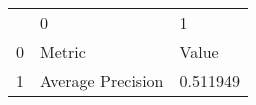 \begin{tabular}{lll}
 & 0 & 1 \\
0 & Metric & Value \\
1 & Average Precision & 0.511949 \\
\end{tabular}
